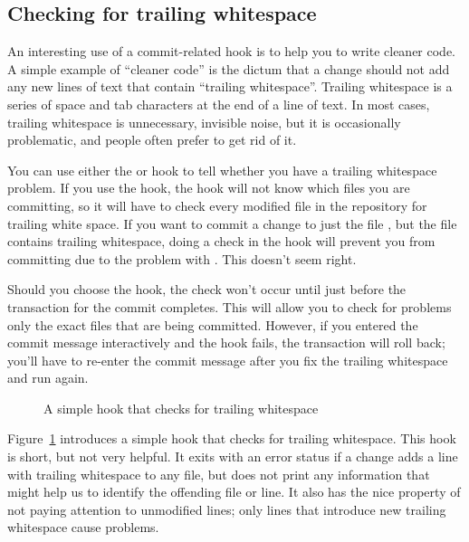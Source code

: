 \subsection{Checking for trailing whitespace}

An interesting use of a commit-related hook is to help you to write
cleaner code.  A simple example of ``cleaner code'' is the dictum that
a change should not add any new lines of text that contain ``trailing
whitespace''.  Trailing whitespace is a series of space and tab
characters at the end of a line of text.  In most cases, trailing
whitespace is unnecessary, invisible noise, but it is occasionally
problematic, and people often prefer to get rid of it.

You can use either the  or  hook to
tell whether you have a trailing whitespace problem.  If you use the
 hook, the hook will not know which files you are
committing, so it will have to check every modified file in the
repository for trailing white space.  If you want to commit a change
to just the file , but the file  contains
trailing whitespace, doing a check in the  hook will
prevent you from committing  due to the problem with
.  This doesn't seem right.

Should you choose the  hook, the check won't occur
until just before the transaction for the commit completes.  This will
allow you to check for problems only the exact files that are being
committed.  However, if you entered the commit message interactively
and the hook fails, the transaction will roll back; you'll have to
re-enter the commit message after you fix the trailing whitespace and
run  again.

\begin{figure}[ht]
  \caption{A simple hook that checks for trailing whitespace}
  \label{ex:hook:ws.simple}
\end{figure}

Figure~\ref{ex:hook:ws.simple} introduces a simple 
hook that checks for trailing whitespace.  This hook is short, but not
very helpful.  It exits with an error status if a change adds a line
with trailing whitespace to any file, but does not print any
information that might help us to identify the offending file or
line.  It also has the nice property of not paying attention to
unmodified lines; only lines that introduce new trailing whitespace
cause problems.

